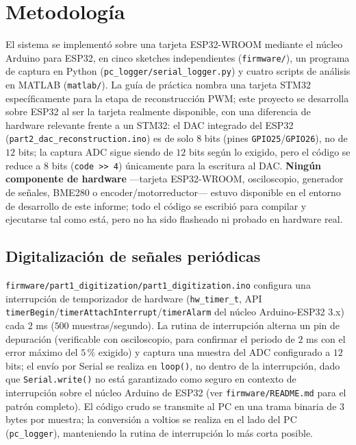 
\section{Metodología}

El sistema se implementó sobre una tarjeta ESP32-WROOM mediante el núcleo Arduino para ESP32, en cinco sketches independientes (\texttt{firmware/}), un programa de captura en Python (\texttt{pc\_logger/serial\_logger.py}) y cuatro scripts de análisis en MATLAB (\texttt{matlab/}). La guía de práctica nombra una tarjeta STM32 específicamente para la etapa de reconstrucción PWM; este proyecto se desarrolla sobre ESP32 al ser la tarjeta realmente disponible, con una diferencia de hardware relevante frente a un STM32: el DAC integrado del ESP32 (\texttt{part2\_dac\_reconstruction.ino}) es de solo $8$ bits (pines \texttt{GPIO25}/\texttt{GPIO26}), no de $12$ bits; la captura ADC sigue siendo de $12$ bits según lo exigido, pero el código se reduce a $8$ bits (\texttt{code >> 4}) únicamente para la escritura al DAC. \textbf{Ningún componente de hardware} —tarjeta ESP32-WROOM, osciloscopio, generador de señales, BME280 o encoder/motorreductor— estuvo disponible en el entorno de desarrollo de este informe; todo el código se escribió para compilar y ejecutarse tal como está, pero no ha sido flasheado ni probado en hardware real.

\subsection{Digitalización de señales periódicas}

\texttt{firmware/part1\_digitization/part1\_digitization.ino} configura una interrupción de temporizador de hardware (\texttt{hw\_timer\_t}, API \texttt{timerBegin}/\texttt{timerAttachInterrupt}/\texttt{timerAlarm} del núcleo Arduino-ESP32 3.x) cada $2$ ms ($500$ muestras/segundo). La rutina de interrupción alterna un pin de depuración (verificable con osciloscopio, para confirmar el periodo de $2$ ms con el error máximo del $5\,\%$ exigido) y captura una muestra del ADC configurado a $12$ bits; el envío por Serial se realiza en \texttt{loop()}, no dentro de la interrupción, dado que \texttt{Serial.write()} no está garantizado como seguro en contexto de interrupción sobre el núcleo Arduino de ESP32 (ver \texttt{firmware/README.md} para el patrón completo). El código crudo se transmite al PC en una trama binaria de $3$ bytes por muestra; la conversión a voltios se realiza en el lado del PC (\texttt{pc\_logger}), manteniendo la rutina de interrupción lo más corta posible.

